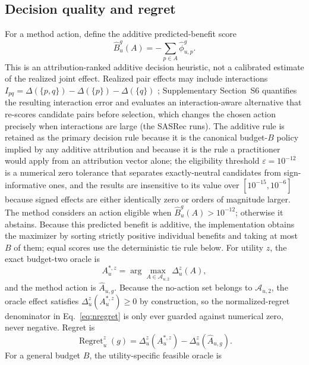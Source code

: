\documentclass[manuscript,screen,review,anonymous]{acmart}
\begin{document}
\subsection{Decision quality and regret}
For a method action, define the additive predicted-benefit score
\begin{equation}
\widehat B_u^g(A)=-\sum_{p\in A}\widehat\phi_{u,p}^g.
\label{eq:predicted-benefit}
\end{equation}
This is an attribution-ranked additive decision heuristic, not a calibrated estimate of the realized joint effect. Realized pair effects may include interactions $I_{pq}=\Delta(\{p,q\})-\Delta(\{p\})-\Delta(\{q\})$ \cite{sundararajan2020shapleytaylor,janizek2021axiomatic}; Supplementary Section~S6 quantifies the resulting interaction error and evaluates an interaction-aware alternative that re-scores candidate pairs before selection, which changes the chosen action precisely when interactions are large (the SASRec runs). The additive rule is retained as the primary decision rule because it is the canonical budget-$B$ policy implied by any additive attribution and because it is the rule a practitioner would apply from an attribution vector alone; the eligibility threshold $\varepsilon=10^{-12}$ is a numerical zero tolerance that separates exactly-neutral candidates from sign-informative ones, and the results are insensitive to its value over $[10^{-15},10^{-6}]$ because signed effects are either identically zero or orders of magnitude larger. The method considers an action eligible when $\widehat B_u^g(A)>10^{-12}$; otherwise it abstains. Because this predicted benefit is additive, the implementation obtains the maximizer by sorting strictly positive individual benefits and taking at most $B$ of them; equal scores use the deterministic tie rule below. For utility $z$, the exact budget-two oracle is
\begin{equation}
A_u^{*,z}=\arg\max_{A\in\mathcal A_{u,2}}\Delta_u^z(A),
\end{equation}
and the method action is $\widehat A_{u,g}$. Because the no-action set belongs to $\mathcal A_{u,2}$, the oracle effect satisfies $\Delta_u^z(A_u^{*,z})\ge0$ by construction, so the normalized-regret denominator in Eq.~\eqref{eq:nregret} is only ever guarded against numerical zero, never negative. Regret is
\begin{equation}
\operatorname{Regret}_u^z(g)=\Delta_u^z(A_u^{*,z})-\Delta_u^z(\widehat A_{u,g}).
\end{equation}
For a general budget $B$, the utility-specific feasible oracle is
\end{document}
